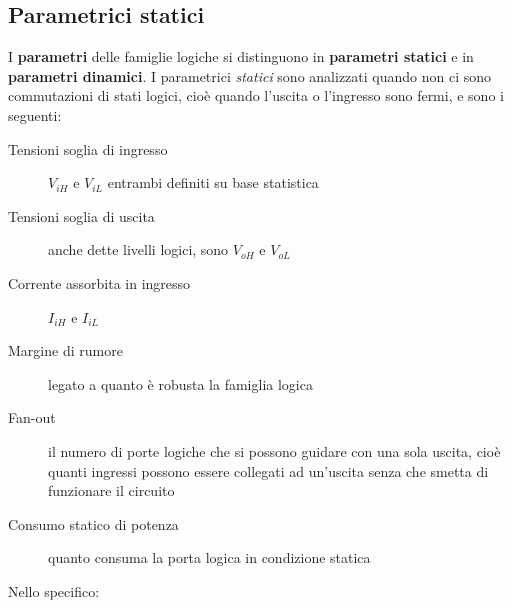 \documentclass[12pt, a4paper]{report}
\begin{document}
\subsection{Parametrici statici}
I \textbf{parametri} delle famiglie logiche si distinguono in \textbf{parametri statici} e in \textbf{parametri dinamici}. I parametrici \textit{statici} sono analizzati quando non ci sono commutazioni di stati logici, cioè quando l'uscita o l'ingresso sono fermi, e sono i seguenti:
\begin{description}
    \item[Tensioni soglia di ingresso] $V_{iH}$ e $V_{iL}$ entrambi definiti su base statistica
    \item[Tensioni soglia di uscita] anche dette livelli logici, sono $V_{oH}$ e $V_{oL}$
    \item[Corrente assorbita in ingresso] $I_{iH}$ e $I_{iL}$
    \item[Margine di rumore] legato a quanto è robusta la famiglia logica
    \item[Fan-out] il numero di porte logiche che si possono guidare con una sola uscita, cioè quanti ingressi possono essere collegati ad un'uscita senza che smetta di funzionare il circuito 
    \item[Consumo statico di potenza] quanto consuma la porta logica in condizione statica
\end{description}
Nello specifico:
\end{document}
